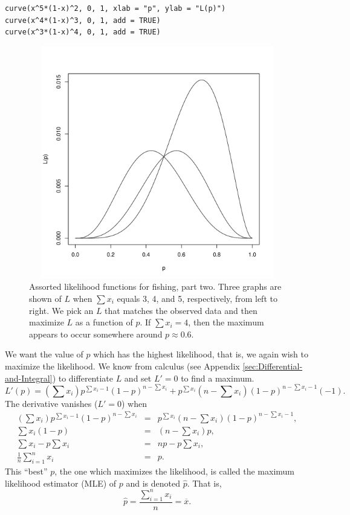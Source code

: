 \documentclass[captions=tableheading]{scrbook}
\begin{document}
\begin{example}
\begin{verbatim}
curve(x^5*(1-x)^2, 0, 1, xlab = "p", ylab = "L(p)")
curve(x^4*(1-x)^3, 0, 1, add = TRUE)
curve(x^3*(1-x)^4, 0, 1, add = TRUE)
\end{verbatim}



\begin{figure}[th]
    \includegraphics[width=5in, height=4in]{img/fishing-part-two.pdf}
    \caption[Assorted likelihood functions for fishing, part two]{\small Assorted likelihood functions for fishing, part two.   Three graphs are shown of \(L\) when \(\sum x_{i}\) equals 3, 4, and 5, respectively, from left to right. We pick an \(L\) that matches the observed data and then maximize \(L\) as a function of \(p\). If \(\sum x_{i}=4\), then the maximum appears to occur somewhere around \(p \approx 0.6\).}
    \label{fig:fishing-part-two}
  \end{figure}

We want the value of \(p\) which has the highest likelihood, that is, we again wish to maximize the likelihood. We know from calculus (see Appendix \ref{sec:Differential-and-Integral}) to differentiate \(L\) and set \(L'=0\) to find a maximum.
\[
L'(p)=\left(\sum x_{i}\right)p^{\sum x_{i}-1}(1-p)^{n-\sum x_{i}}+p^{\sum x_{i}}\left(n-\sum x_{i}\right)(1-p)^{n-\sum x_{i}-1}(-1).
\]
The derivative vanishes (\(L'=0\)) when
\begin{eqnarray*}
\left(\sum x_{i}\right)p^{\sum x_{i}-1}(1-p)^{n-\sum x_{i}} & = & p^{\sum x_{i}}\left(n-\sum x_{i}\right)(1-p)^{n-\sum x_{i}-1},\\
\sum x_{i}(1-p) & = & \left(n-\sum x_{i}\right)p,\\
\sum x_{i}-p\sum x_{i} & = & np-p\sum x_{i},\\
\frac{1}{n}\sum_{i=1}^{n}x_{i} & = & p.
\end{eqnarray*}
This ``best'' \(p\), the one which maximizes the likelihood, is called the maximum likelihood estimator (MLE) of \(p\) and is denoted \(\hat{p}\). That is, 
\begin{equation} 
\hat{p}=\frac{\sum_{i=1}^{n}x_{i}}{n}=\overline{x}.
\end{equation}


\end{example}
\end{document}
